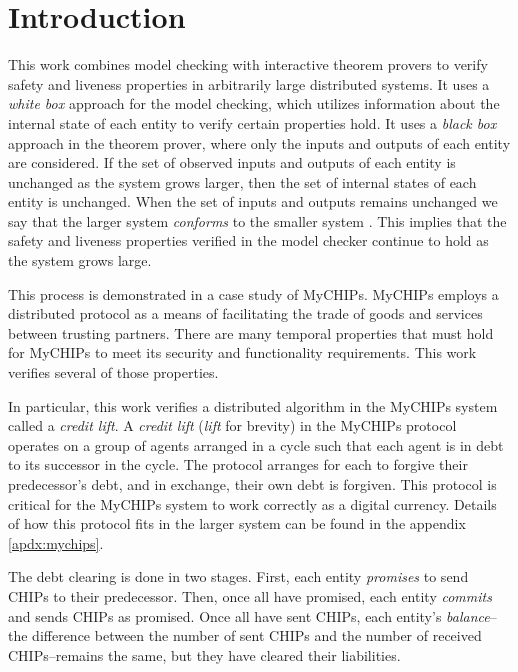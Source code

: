 \documentclass[runningheads]{llncs}
\begin{document}




\section{Introduction}
\label{chap:introduction}
This work combines model checking with interactive theorem provers to verify safety and liveness properties in arbitrarily large distributed systems.
It uses a \emph{white box} approach for the model checking, which utilizes information about the internal state of each entity to verify certain properties hold.
It uses a \emph{black box} approach in the theorem prover, where only the inputs and outputs of each entity are considered.
If the set of observed inputs and outputs of each entity is unchanged as the system grows larger, then the set of internal states of each entity is unchanged.
When the set of inputs and outputs remains unchanged we say that the larger system \emph{conforms} to the smaller system \cite{dill_trace_theory}. This implies that the safety and liveness properties verified in the model checker continue to hold as the system grows large.

This process is demonstrated in a case study of MyCHIPs. MyCHIPs employs a distributed protocol as a means of facilitating the trade of goods and services between trusting partners. There are many temporal properties that must hold for MyCHIPs to meet its security and functionality requirements. This work verifies several of those properties.

In particular, this work verifies a distributed algorithm in the MyCHIPs system called a \emph{credit lift}. A \emph{credit lift} (\emph{lift} for brevity) in the MyCHIPs protocol operates on a group of agents arranged in a cycle such that each agent is in debt to its successor in the cycle. The protocol arranges for each to forgive their predecessor's debt, and in exchange, their own debt is forgiven. This protocol is critical for the MyCHIPs system to work correctly as a digital currency. Details of how this protocol fits in the larger system can be found in the appendix \ref{apdx:mychips}.

The debt clearing is done in two stages. First, each entity \emph{promises} to send CHIPs to their predecessor. Then, once all have promised, each entity \emph{commits} and sends CHIPs as promised. Once all have sent CHIPs, each entity's \emph{balance}--the difference between the number of sent CHIPs and the number of received CHIPs--remains the same, but they have cleared their liabilities. 
\end{document}
